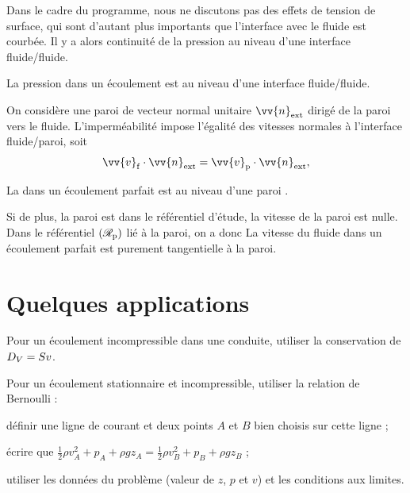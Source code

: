 \documentclass[12pt,fancy]{cours}
\begin{document}
Dans le cadre du programme, nous ne discutons pas des effets de tension de surface, qui sont d’autant plus importants que l’interface avec le fluide est courbée. Il y a alors continuité de la pression au niveau d’une interface fluide/fluide.
\begin{prop}\label{prop:}
La pression dans un écoulement  est  au niveau d'une interface fluide/fluide.
\end{prop}

On considère une paroi  de vecteur normal unitaire $\vv{n}_{\rm{ext}}$ dirigé de la paroi vers le fluide. L'imperméabilité impose l’égalité des vitesses normales à l’interface fluide/paroi, soit
\begin{equation}
\vv{v}_{\rm{f}}\cdot\vv{n}_{\rm{ext}}=\vv{v}_{\rm{p}}\cdot\vv{n}_{\rm{ext}},
\end{equation}

\begin{prop}\label{prop:}
La  dans un écoulement parfait est  au niveau d'une paroi . 
\end{prop}
Si de plus, la paroi est  dans le référentiel d’étude, la vitesse de la paroi est nulle. Dans le référentiel $(\mathcal{R}_{\rm p})$ lié à la paroi, on a donc
La vitesse du fluide dans un écoulement parfait est purement tangentielle à la paroi.

\section{Quelques applications}

\begin{methode}
\item Pour un écoulement incompressible dans une conduite, utiliser la conservation de $D_V = Sv$.
\item Pour un écoulement stationnaire et incompressible, utiliser la relation de Bernoulli :
\begin{liste}
  \item définir une ligne de courant et deux points $A$ et $B$ bien choisis sur cette ligne ;
  \item écrire que $\frac{1}{2}\rho v_A^{2}+p_A+\rho gz_A= \frac{1}{2}\rho v_B^{2}+p_B+\rho gz_B$ ;
  \item utiliser les données du problème  (valeur de $z$, $p$ et $v$) et les conditions aux limites.
\end{liste}
\end{methode}
\end{document}
